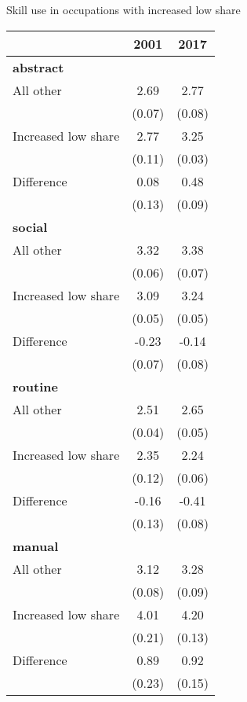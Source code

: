 \begin{center}
\begin{threeparttable}[!h]
\caption{Skill use in occupations with increased low share}
\begin{tabular}{lcc}
\toprule
\toprule
\textbf{}&\multicolumn{1}{c}{\textbf{2001}}&\multicolumn{1}{c}{\textbf{2017}} \\
\midrule
\textbf{abstract} \\
All other           &        2.69&        2.77\\
                    &      (0.07)&      (0.08)\\
Increased low share &        2.77&        3.25\\
                    &      (0.11)&      (0.03)\\
Difference          &        0.08&        0.48\\
                    &      (0.13)&      (0.09)\\
\textbf{social} \\
All other           &        3.32&        3.38\\
                    &      (0.06)&      (0.07)\\
Increased low share &        3.09&        3.24\\
                    &      (0.05)&      (0.05)\\
Difference          &       -0.23&       -0.14\\
                    &      (0.07)&      (0.08)\\
\textbf{routine} \\
All other           &        2.51&        2.65\\
                    &      (0.04)&      (0.05)\\
Increased low share &        2.35&        2.24\\
                    &      (0.12)&      (0.06)\\
Difference          &       -0.16&       -0.41\\
                    &      (0.13)&      (0.08)\\
\textbf{manual} \\
All other           &        3.12&        3.28\\
                    &      (0.08)&      (0.09)\\
Increased low share &        4.01&        4.20\\
                    &      (0.21)&      (0.13)\\
Difference          &        0.89&        0.92\\
                    &      (0.23)&      (0.15)\\
\bottomrule
\bottomrule
\end{tabular}
\end{threeparttable}
\end{center}
